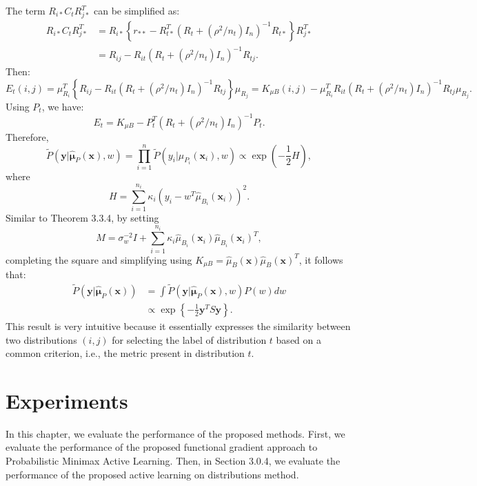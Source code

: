 \documentclass[12pt]{article}
\begin{document}
	The term $R_{i*} C_t R_{j*}^T$ can be simplified as:
	\begin{align}
		R_{i*} C_t R_{j*}^T &= R_{i*} \left\{ r_{**} - R_{t*}^T (R_t + (\rho^2 / n_t) I_n)^{-1} R_{t*} \right\} R_{j*}^T \\
		&= R_{ij} - R_{it} (R_t + (\rho^2 / n_t) I_n)^{-1} R_{tj}.
	\end{align}
	Then:
	\begin{equation}
		E_t(i, j) = \mu_{R_i}^T \left\{ R_{ij} - R_{it} (R_t + (\rho^2 / n_t) I_n)^{-1} R_{tj} \right\} \mu_{R_j} = K_{\mu B}(i, j) - \mu_{R_i}^T R_{it} (R_t + (\rho^2 / n_t) I_n)^{-1} R_{tj} \mu_{R_j}.
	\end{equation}
	Using $P_t$, we have:
	\begin{equation}
		E_t = K_{\mu B} - P_t^T (R_t + (\rho^2 / n_t) I_n)^{-1} P_t.
	\end{equation}
	Therefore,
	\begin{equation}
		\tilde{P}(\mathbf{y}|\hat{\boldsymbol{\mu}}_P(\mathbf{x}), w) = \prod_{i=1}^{n} \tilde{P}(y_i | \hat{\mu}_{P_i}(\mathbf{x}_i), w) \propto \exp\left( -\frac{1}{2} H \right),
	\end{equation}
	where
	\begin{equation}
		H = \sum_{i=1}^{n_i} \kappa_i (y_i - w^T \hat{\mu}_{B_i}(\mathbf{x}_i))^2.
	\end{equation}
	Similar to Theorem 3.3.4, by setting
	\begin{equation}
		M = \sigma_w^{-2} I + \sum_{i=1}^{n_i} \kappa_i \hat{\mu}_{B_i}(\mathbf{x}_i) \hat{\mu}_{B_i}(\mathbf{x}_i)^T,
	\end{equation}
	completing the square and simplifying using $K_{\mu B} = \hat{\mu}_B(\mathbf{x}) \hat{\mu}_B(\mathbf{x})^T$, it follows that:
	\begin{align}
		\tilde{P}(\mathbf{y}|\hat{\boldsymbol{\mu}}_P(\mathbf{x})) &= \int \tilde{P}(\mathbf{y}|\hat{\boldsymbol{\mu}}_P(\mathbf{x}), w) P(w) dw \\
		&\propto \exp\left\{ -\frac{1}{2} \mathbf{y}^T S \mathbf{y} \right\}.
	\end{align}
	This result is very intuitive because it essentially expresses the similarity between two distributions $(i, j)$ for selecting the label of distribution $t$ based on a common criterion, i.e., the metric present in distribution $t$.
	
	\chapter{Experiments}
	In this chapter, we evaluate the performance of the proposed methods. First, we evaluate the performance of the proposed functional gradient approach to Probabilistic Minimax Active Learning. Then, in Section 3.0.4, we evaluate the performance of the proposed active learning on distributions method.
	
\end{document}
